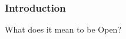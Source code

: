 \documentclass{beamer}
\begin{document}


\begin{frame}
  \frametitle{Introduction}
  \begin{center}\begin{LARGE}What does it mean to be Open?\end{LARGE}\end{center}
\end{frame}



\end{document}
